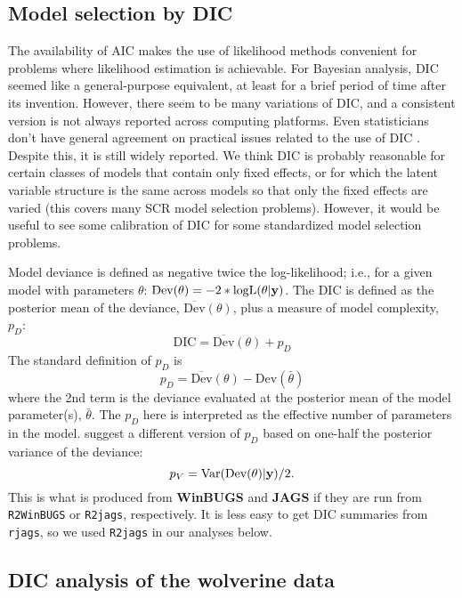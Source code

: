 \subsection{Model selection by DIC }

The availability of AIC makes the use of likelihood methods convenient
for problems where likelihood estimation is achievable.  For Bayesian
analysis, DIC seemed like a
general-purpose equivalent, at least for a brief period of time after
its invention.  However, there seem to be many variations of DIC, and
a consistent version is not always reported across computing
platforms.
Even statisticians don't have general agreement on practical issues
related to the use of DIC \citep{millar:2009}.
Despite this, it is
still widely reported. We think DIC is probably reasonable for certain
classes of models that contain only fixed effects, or for which the
latent variable structure is the same across models so that only the
fixed effects are varied (this covers many SCR model selection
problems).  However, it would be useful to see some calibration of DIC
for some standardized model selection problems.

Model deviance is defined as negative twice the log-likelihood;
i.e., for a given model with parameters $\theta$: $\mbox{Dev}(\theta) =
-2*\mbox{logL}(\theta|{\bf y})$.  The DIC is defined as the
posterior mean of the deviance, $\overline{\mbox{Dev}}(\theta)$, plus a measure of model complexity,
$p_{D}$:
\[
 \mbox{DIC} = \overline{\mbox{Dev}}(\theta) + p_{D}
\]
The standard definition of $p_{D}$ is
\[
 p_{D} = \overline{\mbox{Dev}}(\theta) - \mbox{Dev}(\bar{\theta})
\]
where the 2nd term is the deviance evaluated at the posterior mean of
the model parameter(s), $\bar{\theta}$. The $p_{D}$ here is interpreted as the effective
number of parameters in the model.  \citet{gelman_etal:2004} suggest a
different version of $p_{D}$ based on one-half the posterior variance
of the deviance:
\[
 p_{V} = \mbox{Var}(\mbox{Dev}(\theta)|{\bf y})/2.
\]
This is what is produced from {\bf WinBUGS} and {\bf JAGS} if they are
run from \mbox{\tt R2WinBUGS} or \mbox{\tt R2jags}, respectively.  It
is less easy to get DIC summaries from \mbox{\tt rjags}, so we 
used \mbox{\tt R2jags} in our analyses below.


\subsection{DIC analysis of the wolverine data}
\label{gof.sec.dicwolverine}


